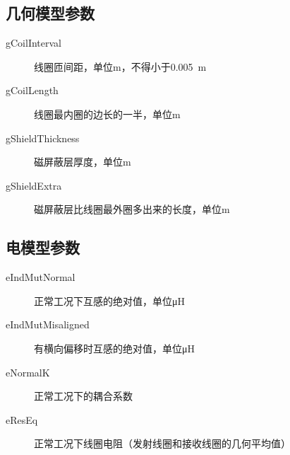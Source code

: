 \documentclass[index]{subfiles}
\begin{document}
\subsection{几何模型参数}
\begin{description}
  \item[gCoilInterval] 线圈匝间距，单位\si{\metre}，不得小于\SI{0.005}{\metre}
  \item[gCoilLength] 线圈最内圈的边长的一半，单位\si{\metre}
  \item[gShieldThickness] 磁屏蔽层厚度，单位\si{\metre}
  \item[gShieldExtra] 磁屏蔽层比线圈最外圈多出来的长度，单位\si{\metre}
\end{description}

\subsection{电模型参数}
\begin{description}
  \item[eIndMutNormal] 正常工况下互感的绝对值，单位\si{\micro\henry}
  \item[eIndMutMisaligned] 有横向偏移时互感的绝对值，单位\si{\micro\henry}
  \item[eNormalK] 正常工况下的耦合系数
  \item[eResEq] 正常工况下线圈电阻（发射线圈和接收线圈的几何平均值）
\end{description}
\end{document}
